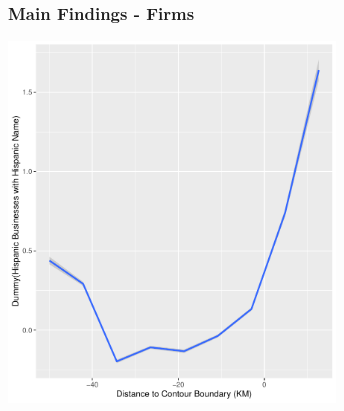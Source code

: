 \documentclass{beamer}
\begin{document}
\begin{frame}
\frametitle{Main Findings - Firms}

\centering
        \includegraphics[width=0.65\textwidth]{../../analysis/Output/graphs/hispanicbusnname.pdf}\\
\end{frame}
\end{document}
